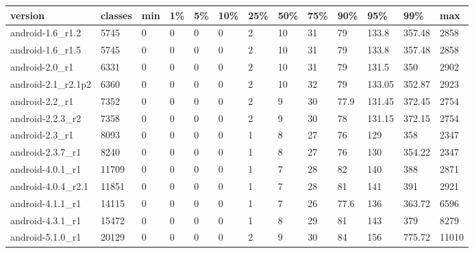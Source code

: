 \begin{tabular}{|l|l|l|l|l|l|l|l|l|l|l|l|l|}
\hline
version&classes&min&1\%&5\%&10\%&25\%&50\%&75\%&90\%&95\%&99\%&max\\
\hline
android-1.6\_r1.2&5745&0&0&0&0&2&10&31&79&133.8&357.48&2858\\
\hline
android-1.6\_r1.5&5745&0&0&0&0&2&10&31&79&133.8&357.48&2858\\
\hline
android-2.0\_r1&6331&0&0&0&0&2&10&31&79&131.5&350&2902\\
\hline
android-2.1\_r2.1p2&6360&0&0&0&0&2&10&32&79&133.05&352.87&2923\\
\hline
android-2.2\_r1&7352&0&0&0&0&2&9&30&77.9&131.45&372.45&2754\\
\hline
android-2.2.3\_r2&7358&0&0&0&0&2&9&30&78&131.15&372.15&2754\\
\hline
android-2.3\_r1&8093&0&0&0&0&1&8&27&76&129&358&2347\\
\hline
android-2.3.7\_r1&8240&0&0&0&0&1&8&27&76&130&354.22&2347\\
\hline
android-4.0.1\_r1&11709&0&0&0&0&1&7&28&82&140&388&2871\\
\hline
android-4.0.4\_r2.1&11851&0&0&0&0&1&7&28&81&141&391&2921\\
\hline
android-4.1.1\_r1&14115&0&0&0&0&1&7&26&77.6&136&363.72&6596\\
\hline
android-4.3.1\_r1&15472&0&0&0&0&1&8&29&81&143&379&8279\\
\hline
android-5.1.0\_r1&20129&0&0&0&0&2&9&30&84&156&775.72&11010\\
\hline
\end{tabular}
